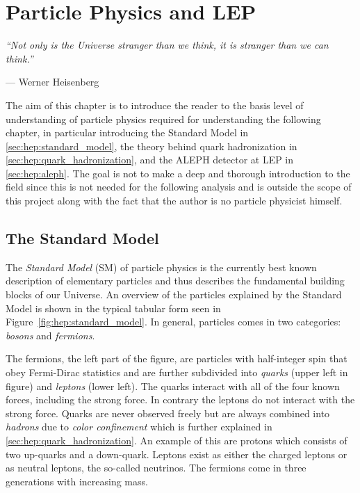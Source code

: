 \documentclass[a4paper, twoside, nobib]{tufte-book}
\newcommand{\autocite}[1]{\citep{#1}}
\begin{document}
\FloatBarrier
\chapter{Particle Physics and LEP}
\label{ch:hep:particle_physcis_LEP}
\epigraph{\textit{``Not only is the Universe stranger than we think, it is stranger than we can think.''}}{--- Werner Heisenberg}

The aim of this chapter is to introduce the reader to the basis level of understanding of particle physics required for understanding the following chapter, in particular introducing the Standard Model in \autoref{sec:hep:standard_model}, the theory behind quark hadronization in \autoref{sec:hep:quark_hadronization}, and the ALEPH detector at LEP in \autoref{sec:hep:aleph}. The goal is not to make a deep and thorough introduction to the field since this is not needed for the following analysis and is outside the scope of this project along with the fact that the author is no particle physicist himself. 


\FloatBarrier
\section{The Standard Model}
\label{sec:hep:standard_model}

The \emph{Standard Model} (SM) \autocite{glashowPartialsymmetriesWeakInteractions1961,salamWeakElectromagneticInteractions1994,weinbergModelLeptons1967} of particle physics is the currently best known description of elementary particles and thus describes the fundamental building blocks of our Universe. An overview of the particles explained by the Standard Model is shown in the typical tabular form seen in Figure~\ref{fig:hep:standard_model}. In general, particles comes in two categories: \emph{bosons} and \emph{fermions}. 

The fermions, the left part of the figure, are particles with half-integer spin that obey Fermi-Dirac statistics and are further subdivided into \emph{quarks} (upper left in figure) and \emph{leptons} (lower left). The quarks interact with all of the four known forces, including the strong force. In contrary the leptons do not interact with the strong force. Quarks are never observed freely but are always combined into \emph{hadrons} due to \emph{color confinement} which is further explained in \autoref{sec:hep:quark_hadronization}. An example of this are protons which consists of two up-quarks and a down-quark. Leptons exist as either the charged leptons or as neutral leptons, the so-called neutrinos. The fermions come in three generations with increasing mass.
\end{document}
